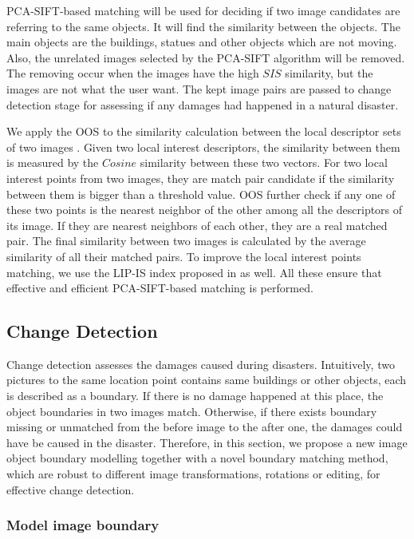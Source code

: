 \documentclass[runningheads,a4paper]{llncs}
\begin{document}
PCA-SIFT-based matching will be used for deciding if two image candidates are referring to the same objects. 
It will find the similarity between the objects. The main objects are the buildings, statues and other objects which are not moving. Also, the unrelated images selected by the PCA-SIFT algorithm will be removed. 
The removing occur when the images have the high $SIS$ similarity, but the images are not what the user want. The kept image pairs are passed to change detection stage for assessing if any damages had happened in a natural disaster.

We apply the OOS to the similarity calculation between the local descriptor sets of two images \cite{DBLP:journals/tmm/ZhaoNTW07}. 
Given two local interest descriptors, the similarity between them is measured by the $Cosine$ similarity between these two vectors. For two local interest points from two images, they are match pair candidate if the similarity between them is bigger than a threshold value. OOS further check if any one of these two points is the nearest neighbor of the other among all the descriptors of its image. If they are nearest neighbors of each other, they are a real matched pair. The final similarity between two images is calculated by the average similarity of all their matched pairs. To improve the local interest points matching, we use the LIP-IS index proposed in \cite{DBLP:journals/tmm/ZhaoNTW07} as well. All these ensure that effective and efficient PCA-SIFT-based matching is performed.

\subsection{Change Detection}

Change detection assesses the damages caused during disasters. Intuitively, two pictures to the same location point contains same buildings or other objects, each is described as a boundary. 
If there is no damage happened at this place, the object boundaries in two images match. 
Otherwise, if there exists boundary missing or unmatched from the before image to the after one, the damages could have be caused in the disaster. Therefore, in this section, we propose a new image object boundary modelling together with a novel boundary matching method, which are robust to different image transformations, rotations or editing, for effective change detection.

\subsubsection{Model image boundary}
\end{document}
